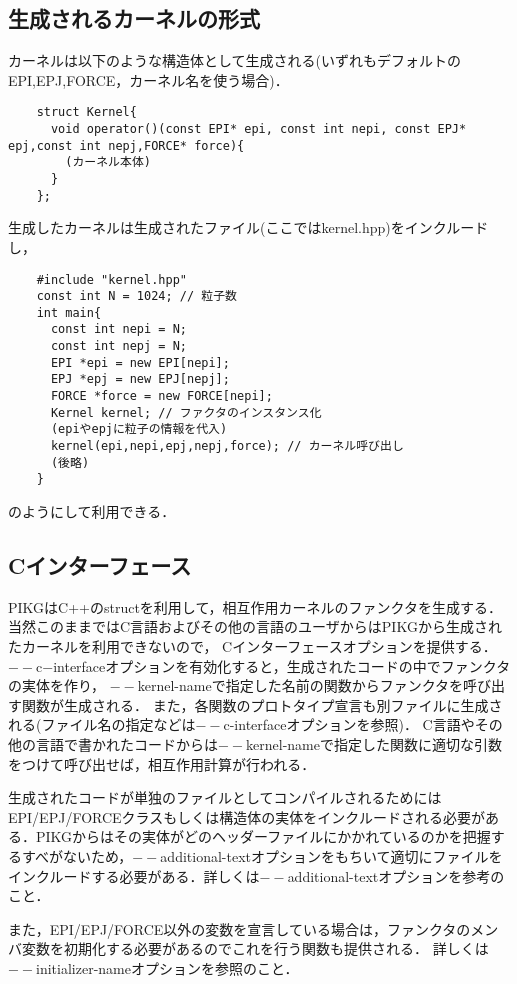 \documentclass{article}
\begin{document}
  \subsection{生成されるカーネルの形式}
  カーネルは以下のような構造体として生成される(いずれもデフォルトのEPI,EPJ,FORCE，カーネル名を使う場合)．
\begin{verbatim}
	struct Kernel{
	  void operator()(const EPI* epi, const int nepi, const EPJ* epj,const int nepj,FORCE* force){
	    (カーネル本体)
	  }
	};
\end{verbatim}
生成したカーネルは生成されたファイル(ここではkernel.hpp)をインクルードし，
\begin{verbatim}
	#include "kernel.hpp"
	const int N = 1024; // 粒子数
	int main{
	  const int nepi = N;
	  const int nepj = N;
	  EPI *epi = new EPI[nepi];
	  EPJ *epj = new EPJ[nepj];
	  FORCE *force = new FORCE[nepi];
	  Kernel kernel; // ファクタのインスタンス化
	  (epiやepjに粒子の情報を代入)
	  kernel(epi,nepi,epj,nepj,force); // カーネル呼び出し
	  (後略)
	}
\end{verbatim}
のようにして利用できる．


\subsection{Cインターフェース}
PIKGはC++のstructを利用して，相互作用カーネルのファンクタを生成する．
当然このままではC言語およびその他の言語のユーザからはPIKGから生成されたカーネルを利用できないので，
Cインターフェースオプションを提供する．
$--$c$-$interfaceオプションを有効化すると，生成されたコードの中でファンクタの実体を作り，
$--$kernel-nameで指定した名前の関数からファンクタを呼び出す関数が生成される．
また，各関数のプロトタイプ宣言も別ファイルに生成される(ファイル名の指定などは$--$c-interfaceオプションを参照)．
C言語やその他の言語で書かれたコードからは$--$kernel-nameで指定した関数に適切な引数をつけて呼び出せば，相互作用計算が行われる．

生成されたコードが単独のファイルとしてコンパイルされるためにはEPI/EPJ/FORCEクラスもしくは構造体の実体をインクルードされる必要がある．PIKGからはその実体がどのヘッダーファイルにかかれているのかを把握するすべがないため，$--$additional-textオプションをもちいて適切にファイルをインクルードする必要がある．詳しくは$--$additional-textオプションを参考のこと．

また，EPI/EPJ/FORCE以外の変数を宣言している場合は，ファンクタのメンバ変数を初期化する必要があるのでこれを行う関数も提供される．
詳しくは$--$initializer-nameオプションを参照のこと．
\end{document}
